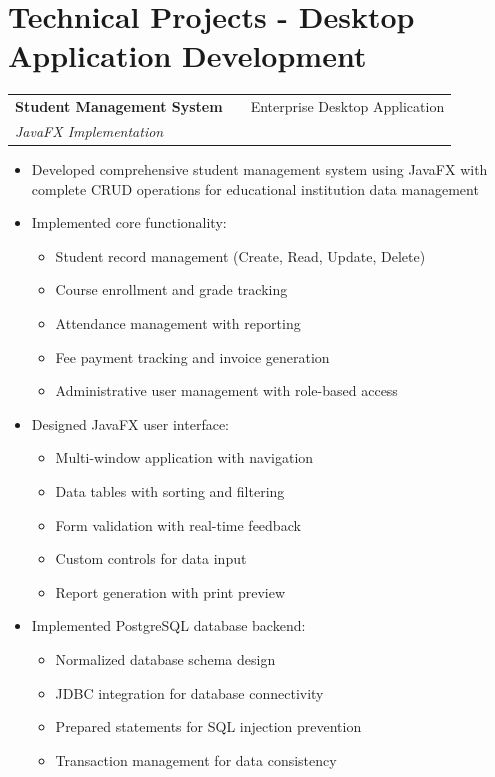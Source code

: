 \documentclass[a4paper,12pt]{article}
\makeatletter
\newenvironment{projectdetailed}[3]
    {
    \begin{tabularx}{\linewidth}{@{}l X r@{}}
    \textbf{#1} & \hfill & #2 \\
    \textit{#3} & & \\[3.75pt]
    \end{tabularx}
    \begin{minipage}[t]{\linewidth}
    \begin{itemize}[nosep,after=\strut, leftmargin=1em, itemsep=2pt,label=--]
    }
    {
    \end{itemize}
    \end{minipage}
    \vspace{6pt}
    }
\makeatother
\begin{document}
\section{Technical Projects - Desktop Application Development}

\begin{projectdetailed}{Student Management System}{Enterprise Desktop Application}{JavaFX Implementation}
\item Developed comprehensive student management system using JavaFX with complete CRUD operations for educational institution data management
\item Implemented core functionality:
\begin{itemize}[nosep, leftmargin=2em]
    \item Student record management (Create, Read, Update, Delete)
    \item Course enrollment and grade tracking
    \item Attendance management with reporting
    \item Fee payment tracking and invoice generation
    \item Administrative user management with role-based access
\end{itemize}
\item Designed JavaFX user interface:
\begin{itemize}[nosep, leftmargin=2em]
    \item Multi-window application with navigation
    \item Data tables with sorting and filtering
    \item Form validation with real-time feedback
    \item Custom controls for data input
    \item Report generation with print preview
\end{itemize}
\item Implemented PostgreSQL database backend:
\begin{itemize}[nosep, leftmargin=2em]
    \item Normalized database schema design
    \item JDBC integration for database connectivity
    \item Prepared statements for SQL injection prevention
    \item Transaction management for data consistency

\end{itemize}
\end{projectdetailed}
\end{document}
